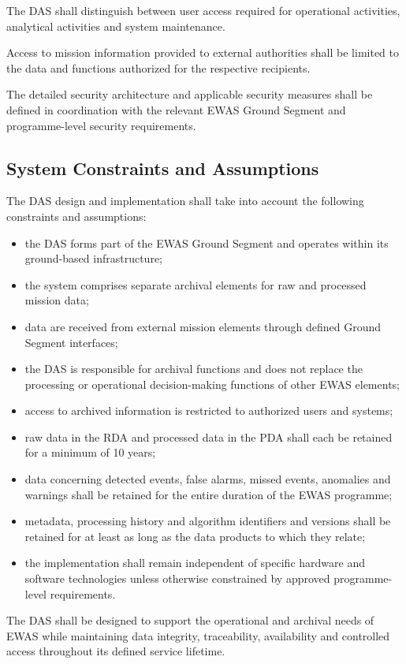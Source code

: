 The DAS shall distinguish between user access required for operational activities, analytical activities and system maintenance.

Access to mission information provided to external authorities shall be limited to the data and functions authorized for the respective recipients.

The detailed security architecture and applicable security measures shall be defined in coordination with the relevant EWAS Ground Segment and programme-level security requirements.

\subsection{System Constraints and Assumptions}

The DAS design and implementation shall take into account the following constraints and assumptions:

\begin{itemize}
    \item the DAS forms part of the EWAS Ground Segment and operates within its ground-based infrastructure;
    \item the system comprises separate archival elements for raw and processed mission data;
    \item data are received from external mission elements through defined Ground Segment interfaces;
    \item the DAS is responsible for archival functions and does not replace the processing or operational decision-making functions of other EWAS elements;
    \item access to archived information is restricted to authorized users and systems;
    \item raw data in the RDA and processed data in the PDA shall each be retained for a minimum of 10 years;
    \item data concerning detected events, false alarms, missed events, anomalies and warnings shall be retained for the entire duration of the EWAS programme;
    \item metadata, processing history and algorithm identifiers and versions shall be retained for at least as long as the data products to which they relate;
    \item the implementation shall remain independent of specific hardware and software technologies unless otherwise constrained by approved programme-level requirements.
\end{itemize}

The DAS shall be designed to support the operational and archival needs of EWAS while maintaining data integrity, traceability, availability and controlled access throughout its defined service lifetime.